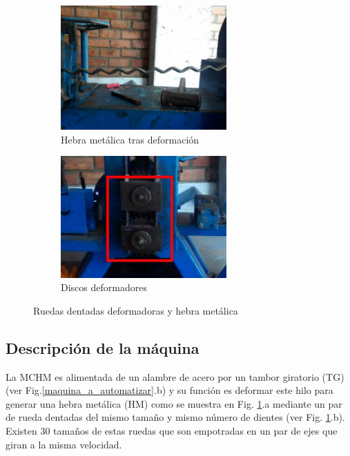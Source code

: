 \documentclass[main_conf.tex]{subfiles}
\begin{document}
\begin{figure}[t]
  \centering
  \begin{subfigure}[b]{0.5\textwidth}
    \centering
    \includegraphics[width=2.5in]{../img/maquina/hebra.jpg}
    \caption{Hebra metálica tras deformación}
  \end{subfigure}
  
  \begin{subfigure}[b]{0.5\textwidth}
    \centering
    \includegraphics[width=2.5in]{../img/maquina/deformadores.jpg}
    \caption{Discos deformadores}
  \end{subfigure}

  
  \caption{Ruedas dentadas deformadoras y hebra metálica}
  \label{deformadora_hm}
\end{figure}


\subsection{Descripción de la máquina}
La MCHM es alimentada de un alambre de acero por un tambor
giratorio (TG) (ver Fig.\ref{maquina_a_automatizar}.b) y su función es
deformar este hilo para generar una hebra metálica (HM) como se muestra
en Fig. \ref{deformadora_hm}.a mediante un par de rueda dentadas del
mismo tamaño y mismo número de dientes (ver Fig. \ref{deformadora_hm}.b).
Existen 30 tamaños de estas ruedas %
que son empotradas en un par de ejes que giran a la misma velocidad.
\end{document}
